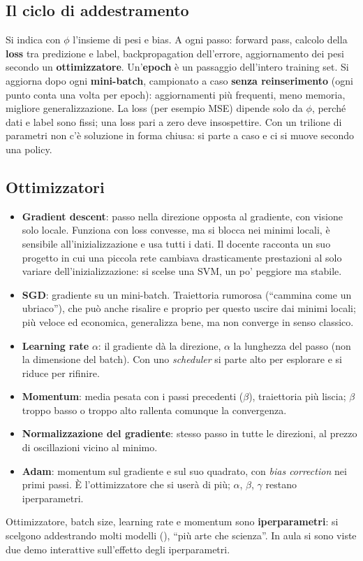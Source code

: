 \subsection{Il ciclo di addestramento}
Si indica con $\phi$ l'insieme di pesi e bias. A ogni passo: forward pass, calcolo della
\textbf{loss} tra predizione e label, backpropagation dell'errore, aggiornamento dei pesi secondo un
\textbf{ottimizzatore}. Un'\textbf{epoch} è un passaggio dell'intero training set. Si aggiorna dopo ogni
\textbf{mini-batch}, campionato a caso \textbf{senza reinserimento} (ogni punto conta una volta per
epoch): aggiornamenti più frequenti, meno memoria, migliore generalizzazione. La loss (per esempio
MSE) dipende solo da $\phi$, perché dati e label sono fissi; una loss pari a zero deve insospettire.
Con un trilione di parametri non c'è soluzione in forma chiusa: si parte a caso e ci si muove secondo
una policy.

\subsection{Ottimizzatori}
\begin{itemize}
  \item \textbf{Gradient descent}: passo nella direzione opposta al gradiente, con visione solo
    locale. Funziona con loss convesse, ma si blocca nei minimi locali, è sensibile
    all'inizializzazione e usa tutti i dati. Il docente racconta un suo progetto in cui una piccola
    rete cambiava drasticamente prestazioni al solo variare dell'inizializzazione: si scelse una SVM,
    un po' peggiore ma stabile.
  \item \textbf{SGD}: gradiente su un mini-batch. Traiettoria rumorosa (``cammina come un
    ubriaco''), che può anche risalire e proprio per questo uscire dai minimi locali; più veloce ed
    economica, generalizza bene, ma non converge in senso classico.
  \item \textbf{Learning rate} $\alpha$: il gradiente dà la direzione, $\alpha$ la lunghezza del passo
    (non la dimensione del batch). Con uno \emph{scheduler} si parte alto per esplorare e si riduce per
    rifinire.
  \item \textbf{Momentum}: media pesata con i passi precedenti ($\beta$), traiettoria più liscia;
    $\beta$ troppo basso o troppo alto rallenta comunque la convergenza.
  \item \textbf{Normalizzazione del gradiente}: stesso passo in tutte le direzioni, al prezzo di
    oscillazioni vicino al minimo.
  \item \textbf{Adam}: momentum sul gradiente e sul suo quadrato, con \emph{bias correction} nei primi
    passi. È l'ottimizzatore che si userà di più; $\alpha$, $\beta$, $\gamma$ restano iperparametri.
\end{itemize}
Ottimizzatore, batch size, learning rate e momentum sono \textbf{iperparametri}: si scelgono
addestrando molti modelli (), ``più arte che scienza''. In aula si sono viste due demo
interattive sull'effetto degli iperparametri.

